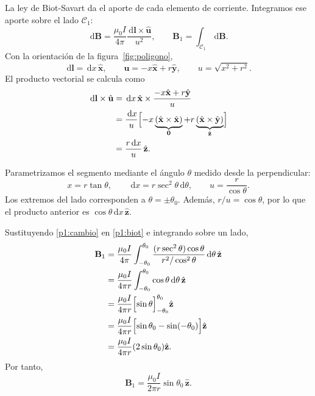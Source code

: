 \documentclass[11pt]{article}
\newcommand{\dd}{\,\mathrm{d}}
\newcommand{\ex}{\hat{\mathbf{x}}}
\newcommand{\ey}{\hat{\mathbf{y}}}
\newcommand{\ez}{\hat{\mathbf{z}}}
\begin{document}
La ley de Biot-Savart da el aporte de cada elemento de corriente.
Integramos ese aporte sobre el lado $\mathcal C_1$:
\begin{equation}
  \dd\mathbf B
    =\frac{\mu_0 I}{4\pi}
      \frac{\dd\mathbf l\times\hat{\mathbf u}}{u^2},
  \qquad \mathbf B_1=\int_{\mathcal C_1}\dd\mathbf B.
  \label{p1:biot}
\end{equation}
Con la orientación de la figura~\ref{fig:poligono},
\[
  \dd\mathbf l=\dd x\,\ex,\qquad
  \mathbf u=-x\ex+r\ey,\qquad
  u=\sqrt{x^2+r^2}.
\]
El producto vectorial se calcula como
\begin{align*}
  \dd\mathbf l\times\hat{\mathbf u}
    &=\dd x\,\ex\times\frac{-x\ex+r\ey}{u}\\
    &=\frac{\dd x}{u}
      \Bigl[-x\underbrace{(\ex\times\ex)}_{\mathbf0}
             +r\underbrace{(\ex\times\ey)}_{\ez}\Bigr]\\
    &=\frac{r\dd x}{u}\,\ez.
\end{align*}

Parametrizamos el segmento mediante el ángulo $\theta$ medido
desde la perpendicular:
\begin{equation}
  x=r\tan\theta,\qquad
  \dd x=r\sec^2\theta\dd\theta,\qquad
  u=\frac{r}{\cos\theta}.
  \label{p1:cambio}
\end{equation}
Los extremos del lado corresponden a $\theta=\pm\theta_0$.
Además, $r/u=\cos\theta$, por lo que el producto anterior es
$\cos\theta\dd x\,\ez$.

Sustituyendo \eqref{p1:cambio} en \eqref{p1:biot} e integrando
sobre un lado,
\begin{align*}
  \mathbf B_1
    &=\frac{\mu_0 I}{4\pi}
      \int_{-\theta_0}^{\theta_0}
      \frac{(r\sec^2\theta)\cos\theta}
           {r^2/\cos^2\theta}\dd\theta\,\ez\\
    &=\frac{\mu_0 I}{4\pi r}
      \int_{-\theta_0}^{\theta_0}\cos\theta\dd\theta\,\ez\\
    &=\frac{\mu_0 I}{4\pi r}
      \Bigl[\sin\theta\Bigr]_{-\theta_0}^{\theta_0}\ez\\
    &=\frac{\mu_0 I}{4\pi r}
      \Bigl[\sin\theta_0-\sin(-\theta_0)\Bigr]\ez\\
    &=\frac{\mu_0 I}{4\pi r}(2\sin\theta_0)\ez.
\end{align*}
Por tanto,
\begin{equation}
  \mathbf B_1=\frac{\mu_0 I}{2\pi r}\sin\theta_0\,\ez.
  \label{p1:lado}
\end{equation}
\end{document}

